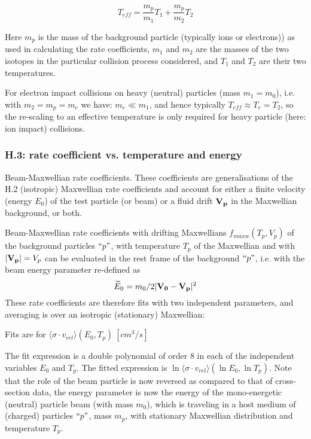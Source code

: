 \documentclass[12pt,dvipdfmx]{article}
\begin{document}
\begin{equation}\label{rescale}
T_{eff} = \frac {m_p}{m_1} T_1 + \frac{m_p}{m_2} T_2
\end{equation}

Here $m_p$ is the mass of the background particle (typically ions or electrons)) as used in calculating the rate coefficients,
$m_1$ and $m_2$ are the masses of the two isotopes in the particular collision
process considered, and $T_1$ and $T_2$ are their two temperatures.

For electron impact collisions on heavy (neutral) particles (mass $m_1=m_0$), i.e. with $m_2 =m_p = m_e$  we have:  $m_e \ll m_1$, and hence
typically $T_{eff} \approx T_e = T_2$, so the re-scaling to an effective temperature is only required for heavy particle (here: ion impact) collisions.

\subsubsection{H.3: rate coefficient vs. temperature and energy}\label{sec1.3.3}
Beam-Maxwellian rate coefficients. These coefficients are generalisations of the H.2 (isotropic) Maxwellian rate coefficients and account for either
a finite velocity (energy $E_0$) of the  test particle (or beam) or a fluid drift ${\bf V_p}$ in the Maxwellian background, or both.

Beam-Maxwellian rate coefficients with drifting Maxwellians $f_{maxw}(T_p,V_p)$ of the background particles $``p"$, with temperature $T_p$ of the
Maxwellian and with $|{\bf V_p}|= V_p$ can be evaluated in the
rest frame of the background $``p"$, i.e. with the beam energy parameter re-defined as
\begin{equation}\label{E0rest}
\widetilde{E}_0=m_0/2|{\bf V_0}-{\bf V_p}|^2
\end{equation}
These rate coefficients are
therefore fits with two independent parameters, and averaging is over an isotropic (stationary) Maxwellian:

Fits are for $\langle\sigma \cdot v_{rel}  \rangle (E_0,T_p) \ [cm^3/s]$

The fit expression is a double polynomial of order 8  in each of the independent variables
$E_0$ and $T_p$. The fitted expression is $\ln\langle\sigma \cdot v_{rel}  \rangle (\ln{E_0},\ln{T_p})$.
Note that the role of the beam particle is now reversed as compared to that of cross-section data,
the energy parameter is now the energy of the mono-energetic (neutral) particle beam (with mass $m_0$), which is traveling in a host medium
of (charged) particles $``p"$, mass $m_p$, with stationary Maxwellian distribution and temperature $T_p$.
\end{document}
